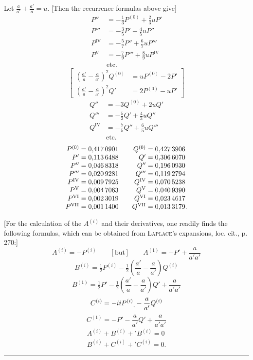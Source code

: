 Let \(\frac a{a'}+\frac{a'}a=u\). [Then the recurrence formulas above give]
\[
\begin{aligned}
P''&=-\tfrac13P^{(0)}+\tfrac23uP'\\
P'''&=-\tfrac35P'+\tfrac45uP''\\
P^{\mathrm{IV}}&=-\tfrac57P''+\tfrac67uP'''\\
P^{\mathrm{V}}&=-\tfrac79P'''+\tfrac89uP^{\mathrm{IV}}\\
&\text{etc.}
\end{aligned}
\]
\[
\left[\begin{aligned}
\left(\frac{a'}a-\frac a{a'}\right)^2Q^{(0)}&=uP^{(0)}-2P'\\
\left(\frac{a'}a-\frac a{a'}\right)^2Q'&=2P^{(0)}-uP'
\end{aligned}\right]
\]
\[
\begin{aligned}
Q''&=-3Q^{(0)}+2uQ'\\
Q'''&=-\tfrac53Q'+\tfrac43uQ''\\
Q^{\mathrm{IV}}&=-\tfrac75Q''+\tfrac65uQ'''\\
&\text{etc.}
\end{aligned}
\]
\hypertarget{native-392}{}
\[
\begin{array}{r@{\;}l@{\qquad}r@{\;}l}
P^{(0)}&=0{,}417\,0901&Q^{(0)}&=0{,}427\,3906\\
P'&=0{,}113\,6488&Q'&=0{,}306\,6070\\
P''&=0{,}046\,8318&Q''&=0{,}196\,0930\\
P'''&=0{,}020\,9281&Q'''&=0{,}119\,2794\\
P^{\mathrm{IV}}&=0{,}009\,7925&Q^{\mathrm{IV}}&=0{,}070\,5238\\
P^{\mathrm{V}}&=0{,}004\,7063&Q^{\mathrm{V}}&=0{,}040\,9390\\
P^{\mathrm{VI}}&=0{,}002\,3019&Q^{\mathrm{VI}}&=0{,}023\,4617\\
P^{\mathrm{VII}}&=0{,}001\,1400&Q^{\mathrm{VII}}&=0{,}013\,3179.
\end{array}
\]

[For the calculation of the \(A^{(i)}\) and their derivatives, one readily finds the following formulas, which can be obtained from \textsc{Laplace}'s expansions, loc. cit., p. 270:]
\[
A^{(i)}=-P^{(i)}\qquad[\text{but}]\qquad A^{(1)}=-P'+\frac a{a'a'}
\]
\[
B^{(i)}=\tfrac12P^{(i)}-\tfrac12\left(\frac{a'}a-\frac a{a'}\right)Q^{(i)}
\]
\[
B^{(1)}=\tfrac12P'-\tfrac12\left(\frac{a'}a-\frac a{a'}\right)Q'+\frac a{a'a'}
\]
\[
C^{(i)}=-iiP^{(i)}\mathord{\text{\raisebox{-.6ex}{.}}}-\frac a{a'}Q^{(i)}
\]
\[
C^{(1)}=-P'-\frac a{a'}Q'+\frac a{a'a'}
\]
\[
\begin{gathered}
A^{(i)}+B^{(i)}+{}'B^{(i)}=0\\
B^{(i)}+C^{(i)}+{}'C^{(i)}=0.
\end{gathered}
\]
\begin{center}\rule{.18\linewidth}{.3pt}\end{center}

